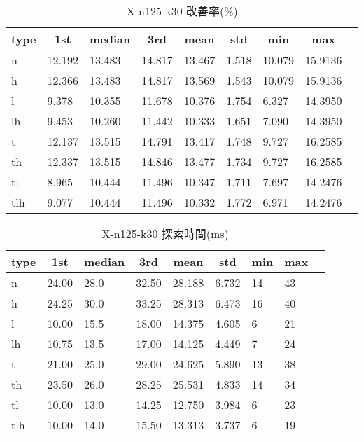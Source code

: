 \begin{table}[htbp]
    \caption{X-n125-k30 改善率(\%)}
    \begin{tabular}{|l|l|l|l|l|l|l|l|l|}\hline
    \multicolumn{1}{|c|}{\textbf{type}}
    &\multicolumn{1}{|c|}{\textbf{1st}}
    &\multicolumn{1}{c|}{\textbf{median}}
    &\multicolumn{1}{c|}{\textbf{3rd}}
    &\multicolumn{1}{c|}{\textbf{mean}}
    &\multicolumn{1}{c|}{\textbf{std}}
    &\multicolumn{1}{c|}{\textbf{min}}
    &\multicolumn{1}{c|}{\textbf{max}}\\\hline
	n & 12.192 & 13.483 & 14.817 & 13.467 & 1.518 & 10.079 & 15.9136\\\hline
	h & 12.366 & 13.483 & 14.817 & 13.569 & 1.543 & 10.079 & 15.9136\\\hline
	l & 9.378 & 10.355 & 11.678 & 10.376 & 1.754 & 6.327 & 14.3950\\\hline
	lh & 9.453 & 10.260 & 11.442 & 10.333 & 1.651 & 7.090 & 14.3950\\\hline
	t & 12.137 & 13.515 & 14.791 & 13.417 & 1.748 & 9.727 & 16.2585\\\hline
	th & 12.337 & 13.515 & 14.846 & 13.477 & 1.734 & 9.727 & 16.2585\\\hline
	tl & 8.965 & 10.444 & 11.496 & 10.347 & 1.711 & 7.697 & 14.2476\\\hline
	tlh & 9.077 & 10.444 & 11.496 & 10.332 & 1.772 & 6.971 & 14.2476\\\hline
	\end{tabular}
\end{table}
\begin{table}[htbp]
    \caption{X-n125-k30 探索時間(ms)}
    \begin{tabular}{|l|l|l|l|l|l|l|l|l|}\hline
    \multicolumn{1}{|c|}{\textbf{type}}
    &\multicolumn{1}{|c|}{\textbf{1st}}
    &\multicolumn{1}{c|}{\textbf{median}}
    &\multicolumn{1}{c|}{\textbf{3rd}}
    &\multicolumn{1}{c|}{\textbf{mean}}
    &\multicolumn{1}{c|}{\textbf{std}}
    &\multicolumn{1}{c|}{\textbf{min}}
    &\multicolumn{1}{c|}{\textbf{max}}\\\hline
	n & 24.00 & 28.0 & 32.50 & 28.188 & 6.732 & 14 & 43\\\hline
	h & 24.25 & 30.0 & 33.25 & 28.313 & 6.473 & 16 & 40\\\hline
	l & 10.00 & 15.5 & 18.00 & 14.375 & 4.605 & 6 & 21\\\hline
	lh & 10.75 & 13.5 & 17.00 & 14.125 & 4.449 & 7 & 24\\\hline
	t & 21.00 & 25.0 & 29.00 & 24.625 & 5.890 & 13 & 38\\\hline
	th & 23.50 & 26.0 & 28.25 & 25.531 & 4.833 & 14 & 34\\\hline
	tl & 10.00 & 13.0 & 14.25 & 12.750 & 3.984 & 6 & 23\\\hline
	tlh & 10.00 & 14.0 & 15.50 & 13.313 & 3.737 & 6 & 19\\\hline
	\end{tabular}
\end{table}
